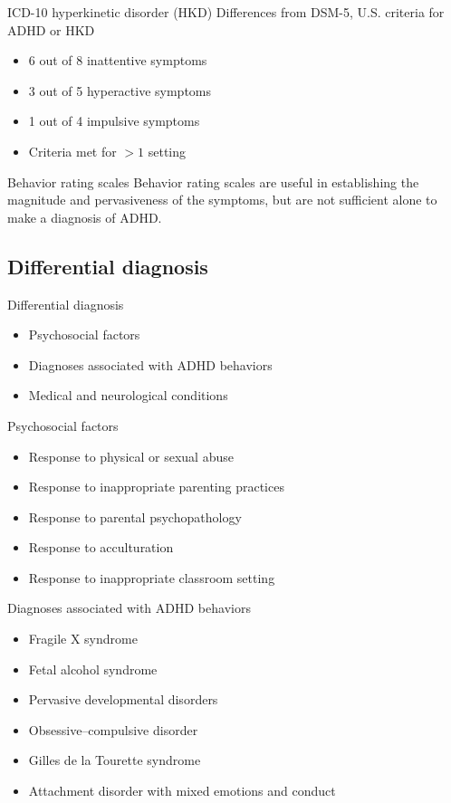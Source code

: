 \documentclass{beamer}
\begin{document}
\begin{frame}{ICD-10 hyperkinetic disorder (HKD)}
Differences from DSM-5, U.S. criteria for ADHD or HKD

\begin{itemize}
    \item 6 out of 8 inattentive symptoms
    \item 3 out of 5 hyperactive symptoms
    \item 1 out of 4 impulsive symptoms
    \item Criteria met for $>1$ setting
\end{itemize}
\end{frame}

\begin{frame}{Behavior rating scales}
Behavior rating scales are useful in establishing the magnitude and
pervasiveness of the symptoms, but are not sufficient alone to make a
diagnosis of ADHD.
\end{frame}

\subsection{Differential diagnosis}
\begin{frame}{Differential diagnosis}
\begin{itemize}
    \item Psychosocial factors
    \item Diagnoses associated with ADHD behaviors
    \item Medical and neurological conditions
\end{itemize}
\end{frame}

\begin{frame}{Psychosocial factors}
\begin{itemize}
    \item Response to physical or sexual abuse
    \item Response to inappropriate parenting practices
    \item Response to parental psychopathology
    \item Response to acculturation
    \item Response to inappropriate classroom setting
\end{itemize}
\end{frame}

\begin{frame}{Diagnoses associated with ADHD behaviors}
\begin{itemize}
    \item Fragile X syndrome
    \item Fetal alcohol syndrome
    \item Pervasive developmental disorders
    \item Obsessive--compulsive disorder
    \item Gilles de la Tourette syndrome
    \item Attachment disorder with mixed emotions and conduct
\end{itemize}
\end{frame}
\end{document}
